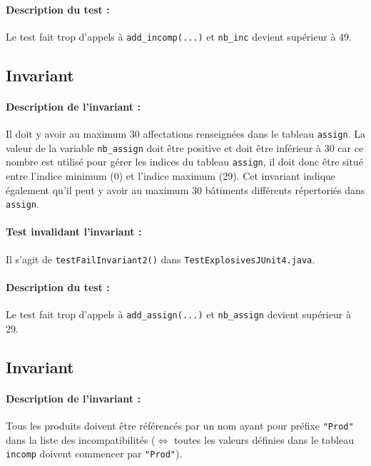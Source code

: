 \documentclass{article}
\begin{document}
\vspace{-0.2cm}
\paragraph{Description du test :} Le test fait trop d'appels à \texttt{add\_incomp(...)} et \texttt{nb\_inc} devient supérieur à 49.  

\subsection{Invariant }

\paragraph{Description de l'invariant :} Il doit y avoir au maximum 30 affectations renseignées dans le tableau \texttt{assign}. La valeur de la variable \texttt{nb\_assign} doit être positive et doit être inférieur à 30 car ce nombre est utilisé pour gérer les indices du tableau \texttt{assign}, il doit donc être situé entre l'indice minimum (0) et l'indice maximum (29). Cet invariant indique également qu'il peut y avoir au maximum 30 bâtiments différents répertoriés dans \texttt{assign}.

\vspace{-0.2cm}
\paragraph{Test invalidant l'invariant :} Il s'agit de \texttt{testFailInvariant2()} dans \texttt{TestExplosivesJUnit4.java}.

\vspace{-0.2cm}
\paragraph{Description du test :} Le test fait trop d'appels à \texttt{add\_assign(...)} et \texttt{nb\_assign} devient supérieur à 29. 

\subsection{Invariant }

\paragraph{Description de l'invariant :} Tous les produits doivent être référencés par un nom ayant pour préfixe \texttt{"Prod"} dans la liste des incompatibilités ($\Leftrightarrow$ toutes les valeurs définies dans le tableau \texttt{incomp} doivent commencer par \texttt{"Prod"}).
\end{document}

